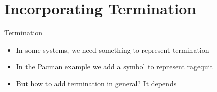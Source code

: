 \documentclass{beamer}
\newcommand{\C}{\mathcal C}
\begin{document}








\part{Incorporating Termination}\frame{\partpage}


\begin{frame}{Termination}
\begin{itemize}
    \item In some systems, we need something to represent termination

    \pause

    \item In the Pacman example we add a symbol to represent ragequit
    \pause
    
    \item But how to add termination in general? \pause It depends
\end{itemize}
\end{frame}
\end{document}
